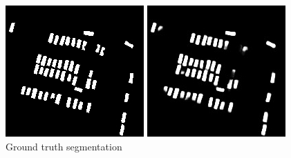 \documentclass[a4paper,11pt]{article}
\begin{document}
\begin{figure}[H]
  \includegraphics[width=\linewidth]{gan_vs_class/label_1}
  \caption{Ground truth segmentation}\label{fig:label_1}
\endminipage\hfill
{}
  \includegraphics[width=\linewidth]{gan_vs_class/class_1}

\end{figure}
\end{document}
